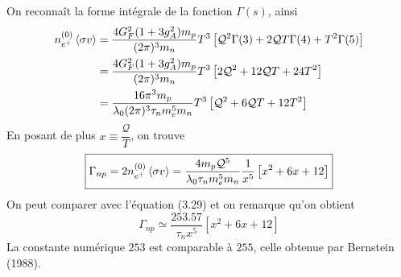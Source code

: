 \documentclass{article}
\numberwithin{equation}{section}
\begin{document}
On reconnaît la forme intégrale de la fonction $\Gamma(s)$, ainsi
\begin{align*}
        n_{e^{+}}^{(0)}\expval{\sigma v} &= 
        \frac{4 G_F^2(1 + 3g_A^2) m_p}{ (2\pi)^{3}m_n}T^3
        \left[ \mathcal{Q}^{2}\Gamma(3) + 2 \mathcal{Q}T \Gamma(4)
        + T^2 \Gamma(5)\right] \\
        &= 
        \frac{4 G_F^2(1 + 3g_A^2) m_p}{ (2\pi)^{3}m_n}T^3
        \left[ 2\mathcal{Q}^{2} + 12 \mathcal{Q}T
        + 24T^2 \right] \\
        &= 
        \frac{16 \pi^3 m_p}{ \lambda_0(2\pi)^{3}\tau_n m_e^5 m_n}T^3
        \left[ \mathcal{Q}^{2} + 6 \mathcal{Q}T
        + 12T^2 \right] \\
\end{align*}
En posant de plus $x \equiv \dfrac{\mathcal{Q}}{T}$, on trouve
\[
        \boxed{\Gamma_{np} = 2 n_{e^{+}}^{(0)} \expval{\sigma v} 
        = 
        \frac{ 4 m_p \mathcal{Q}^5}{ \lambda_0 \tau_n m_e^5 m_n} \frac{1}{x^5}
        \left[ x^2 + 6x 
+ 12 \right]}
\]
On peut comparer avec l'équation (3.29) et on remarque qu'on 
obtient
\[
        \boxed{\Gamma_{np} \simeq \frac{253.57}{\tau_n x^5} \left[ x^2 + 6x + 12 \right]}
\]
La constante numérique $253$ est comparable à $255$, 
celle obtenue par Bernstein (1988).
\end{document}
